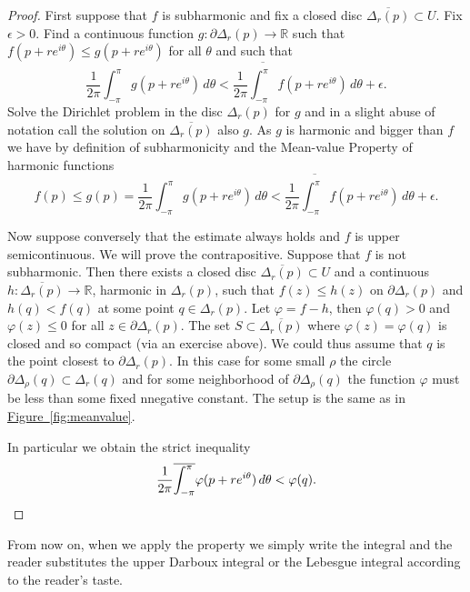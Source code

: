 \documentclass[12pt,openany]{book}
\newcommand{\R}{{\mathbb{R}}}
\theoremstyle{plain}
\theoremstyle{remark}
\theoremstyle{definition}
\theoremstyle{exercise}
\theoremstyle{example}
\newcommand{\figureref}[1]{\hyperref[#1]{Figure~\ref*{#1}}}
\begin{document}
\begin{proof}
First suppose that $f$ is subharmonic and fix a closed disc
$\overline{\Delta_r(p)} \subset U$.
Fix $\epsilon > 0$.
Find a continuous function $g \colon \partial \Delta_r(p) \to \R$
such that $f(p+ re^{i\theta}) \leq g(p+re^{i\theta})$ for all $\theta$
and such that
\begin{equation*}
\frac{1}{2\pi} \int_{-\pi}^{\pi} g(p+re^{i\theta})\, d\theta <
\frac{1}{2\pi} \overline{\int_{-\pi}^{\pi}} f(p+re^{i\theta})\, d\theta + \epsilon .
\end{equation*}
Solve the Dirichlet problem in the disc $\Delta_r(p)$ for $g$ and
in a slight abuse of notation call the solution on $\overline{\Delta_r(p)}$
also $g$.  As $g$ is harmonic and bigger than $f$ we have by
definition of subharmonicity and the Mean-value Property of harmonic
functions
\begin{equation*}
f(p) \leq g(p) =
\frac{1}{2\pi} \int_{-\pi}^{\pi} g(p+re^{i\theta})\, d\theta <
\frac{1}{2\pi} \overline{\int_{-\pi}^{\pi}} f(p+re^{i\theta})\, d\theta + \epsilon .
\end{equation*}

Now suppose conversely that the estimate always holds and $f$ is upper
semicontinuous.  We will prove the contrapositive.  Suppose that $f$ is not
subharmonic.  Then there exists a closed disc 
$\overline{\Delta_r(p)} \subset U$ and a continuous
$h \colon \overline{\Delta_r(p)} \to \R$, harmonic in $\Delta_r(p)$,
such that $f(z) \leq h(z)$ on $\partial \Delta_r(p)$ and
$h(q) < f(q)$ at some point $q \in \Delta_r(p)$.
Let $\varphi = f-h$, then $\varphi(q) > 0$ and $\varphi(z) \leq 0$
for all $z \in \partial \Delta_r(p)$.  The set
$S \subset \overline{\Delta_r(p)}$ where $\varphi(z) = \varphi(q)$ is closed and so
compact (via an exercise above).
We could thus assume that $q$ is the point closest to
$\partial \Delta_r(p)$.  In this case for some small $\rho$ the circle
$\partial \Delta_\rho(q) \subset \Delta_r(q)$ and for some neighborhood
of $\partial \Delta_\rho(q)$ the function $\varphi$ must be less than some fixed
nnegative constant.  The setup is the same as in \figureref{fig:meanvalue}.

In particular we obtain the strict inequality
\begin{equation*}
\frac{1}{2\pi} \overline{\int_{-\pi}^{\pi}} \varphi(p+re^{i\theta})\, d\theta <
\varphi(q) . \qedhere
\end{equation*}
\end{proof}

From now on, when we apply the property we simply write the integral and
the reader substitutes the upper Darboux integral or the Lebesgue integral
according to the reader's taste.
\end{document}
